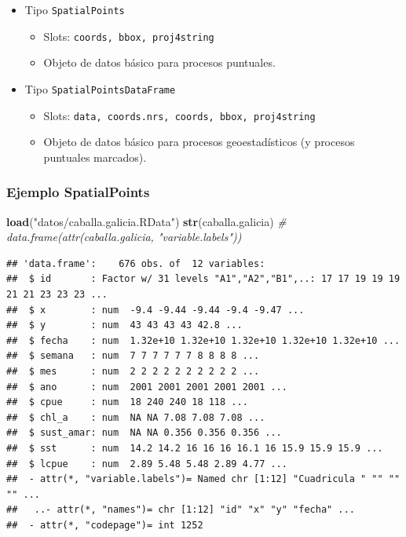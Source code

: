 \documentclass[
]{book}
\newenvironment{Shaded}{\begin{snugshade}}{\end{snugshade}}
\newcommand{\CommentTok}[1]{\textcolor[rgb]{0.56,0.35,0.01}{\textit{#1}}}
\newcommand{\FunctionTok}[1]{\textcolor[rgb]{0.13,0.29,0.53}{\textbf{#1}}}
\newcommand{\NormalTok}[1]{#1}
\newcommand{\StringTok}[1]{\textcolor[rgb]{0.31,0.60,0.02}{#1}}
\theoremstyle{break}
\theoremstyle{definition}
\theoremstyle{definition}
\theoremstyle{definition}
\theoremstyle{definition}
\theoremstyle{remark}
\begin{document}
\begin{itemize}
\item
  Tipo \texttt{SpatialPoints}

  \begin{itemize}
  \item
    Slots: \texttt{coords,\ bbox,\ proj4string}
  \item
    Objeto de datos básico para procesos puntuales.
  \end{itemize}
\item
  Tipo \texttt{SpatialPointsDataFrame}

  \begin{itemize}
  \item
    Slots: \texttt{data,\ coords.nrs,\ coords,\ bbox,\ proj4string}
  \item
    Objeto de datos básico para procesos geoestadísticos (y procesos
    puntuales marcados).
  \end{itemize}
\end{itemize}

\subsubsection{Ejemplo SpatialPoints}\label{ejemplo-spatialpoints}

\begin{Shaded}
\begin{Highlighting}[]
\FunctionTok{load}\NormalTok{(}\StringTok{"datos/caballa.galicia.RData"}\NormalTok{)}
\FunctionTok{str}\NormalTok{(caballa.galicia)  }\CommentTok{\# data.frame(attr(caballa.galicia, "variable.labels"))}
\end{Highlighting}
\end{Shaded}

\begin{verbatim}
## 'data.frame':    676 obs. of  12 variables:
##  $ id       : Factor w/ 31 levels "A1","A2","B1",..: 17 17 19 19 19 21 21 23 23 23 ...
##  $ x        : num  -9.4 -9.44 -9.44 -9.4 -9.47 ...
##  $ y        : num  43 43 43 43 42.8 ...
##  $ fecha    : num  1.32e+10 1.32e+10 1.32e+10 1.32e+10 1.32e+10 ...
##  $ semana   : num  7 7 7 7 7 7 8 8 8 8 ...
##  $ mes      : num  2 2 2 2 2 2 2 2 2 2 ...
##  $ ano      : num  2001 2001 2001 2001 2001 ...
##  $ cpue     : num  18 240 240 18 118 ...
##  $ chl_a    : num  NA NA 7.08 7.08 7.08 ...
##  $ sust_amar: num  NA NA 0.356 0.356 0.356 ...
##  $ sst      : num  14.2 14.2 16 16 16 16.1 16 15.9 15.9 15.9 ...
##  $ lcpue    : num  2.89 5.48 5.48 2.89 4.77 ...
##  - attr(*, "variable.labels")= Named chr [1:12] "Cuadricula " "" "" "" ...
##   ..- attr(*, "names")= chr [1:12] "id" "x" "y" "fecha" ...
##  - attr(*, "codepage")= int 1252
\end{verbatim}
\end{document}
